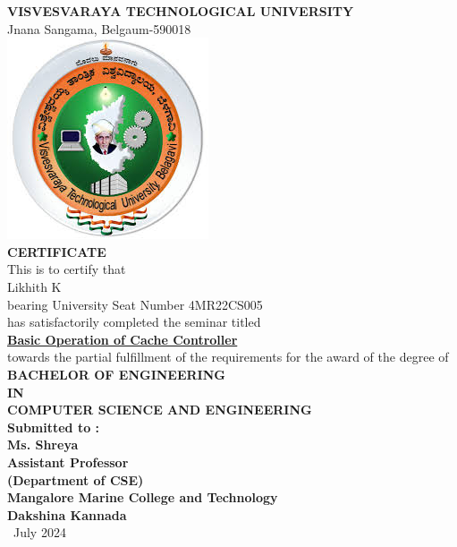 \documentclass[12pt, a4paper]{report}
\begin{document}
	
	\begin{titlepage}
		\begin{center}
			\textbf{{\large VISVESVARAYA TECHNOLOGICAL UNIVERSITY}}\\
			{\normalsize Jnana Sangama, Belgaum-590018}\\
			\vspace{0.5in}
			\includegraphics[scale=0.5]{images/vtu.jpeg}\\
			\vspace{0.5in}
			\textbf{CERTIFICATE}\\
			\vspace{0.3in}
			This is to certify that \\
			\vspace{0.2in}
			Likhith K\\
			\vspace{0.2in}
			bearing University Seat Number 4MR22CS005\\
			\vspace{0.2in}
			has satisfactorily completed the seminar titled \\
			\vspace{0.2in}
			\underline{\textbf{Basic Operation of Cache Controller}}\\
			\vspace{0.2in}
			towards the partial fulfillment of the requirements for the award of the degree of\\
			\vspace{0.2in}
			\textbf{BACHELOR OF ENGINEERING\\IN\\COMPUTER SCIENCE AND ENGINEERING}\\
			\vspace{0.5in}
			\textbf{Submitted to :} \hspace{3.5in}\\
			\vspace{0.1in}\textbf{Ms. Shreya}\\ 
			\vspace{0.1in} \textbf{Assistant Professor}\\
			\vspace{0.1in}
			\textbf{(Department of CSE)}  \\
			\vspace{0.1in}
			\textbf{Mangalore Marine College and Technology}\\
			\vspace{0.01in}
			\textbf{Dakshina Kannada}\\
			\vspace{0.01in}
			\ July 2024
		\end{center}
	\end{titlepage}
	
\end{document}
